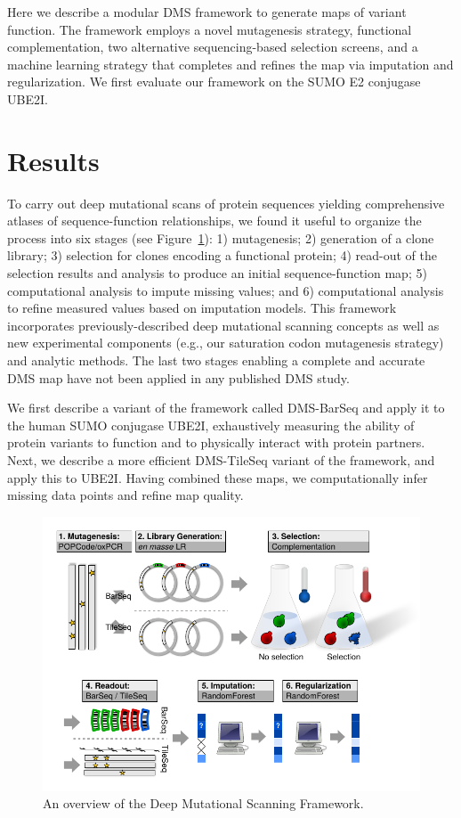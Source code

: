 Here we describe a modular DMS framework to generate maps of variant function. The framework employs a novel mutagenesis strategy, functional complementation, two alternative sequencing-based selection screens, and a machine learning strategy that completes and refines the map via imputation and regularization. We first evaluate our framework on the SUMO E2 conjugase UBE2I.

\section{Results}

To carry out deep mutational scans of protein sequences yielding comprehensive atlases of sequence-function relationships, we found it useful to organize the process into six stages (see Figure~\ref{fig:framework}): 1) mutagenesis; 2) generation of a clone library; 3) selection for clones encoding a functional protein; 4) read-out of the selection results and analysis to produce an initial sequence-function map; 5) computational analysis to impute missing values; and 6) computational analysis to refine measured values based on imputation models. This framework incorporates previously-described deep mutational scanning concepts as well as new experimental components (e.g., our saturation codon mutagenesis strategy) and analytic methods.  The last two stages enabling a complete and accurate DMS map have not been applied in any published DMS study.

We first describe a variant of the framework called DMS-BarSeq and apply it to the human SUMO conjugase UBE2I, exhaustively measuring the ability of protein variants to function and to physically interact with protein partners.  Next, we describe a more efficient DMS-TileSeq variant of the framework, and apply this to UBE2I.  Having combined these maps, we computationally infer missing data points and refine map quality.


\begin{figure}[h!]
	\centering
	\includegraphics[width=\textwidth]{img/framework_flowchart.pdf}
	\caption{An overview of the Deep Mutational Scanning Framework.}
	\label{fig:framework}
\end{figure}


